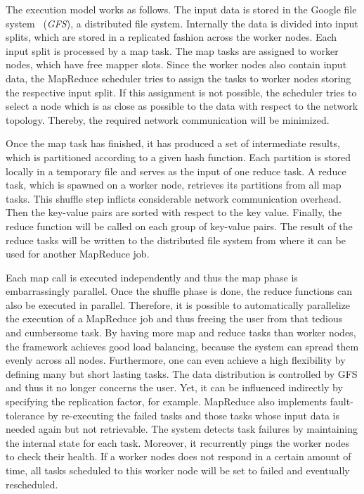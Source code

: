 The execution model works as follows.
The input data is stored in the Google file system~\cite{ghemawat:2003a} (\emph{GFS}), a distributed file system.
Internally the data is divided into input splits, which are stored in a replicated fashion across the worker nodes.
Each input split is processed by a map task.
The map tasks are assigned to worker nodes, which have free mapper slots.
Since the worker nodes also contain input data, the MapReduce scheduler tries to assign the tasks to worker nodes storing the respective input split.
If this assignment is not possible, the scheduler tries to select a node which is as close as possible to the data with respect to the network topology.
Thereby, the required network communication will be minimized.

Once the map task has finished, it has produced a set of intermediate results, which is partitioned according to a given hash function.
Each partition is stored locally in a temporary file and serves as the input of one reduce task.
A reduce task, which is spawned on a worker node, retrieves its partitions from all map tasks.
This shuffle step inflicts considerable network communication overhead.
Then the key-value pairs are sorted with respect to the key value.
Finally, the reduce function will be called on each group of key-value pairs.
The result of the reduce tasks will be written to the distributed file system from where it can be used for another MapReduce job.

Each map call is executed independently and thus the map phase is embarrassingly parallel.
Once the shuffle phase is done, the reduce functions can also be executed in parallel.
Therefore, it is possible to automatically parallelize the execution of a MapReduce job and thus freeing the user from that tedious and cumbersome task.
By having more map and reduce tasks than worker nodes, the framework achieves good load balancing, because the system can spread them evenly across all nodes.
Furthermore, one can even achieve a high flexibility by defining many but short lasting tasks.
The data distribution is controlled by GFS and thus it no longer concerns the user.
Yet, it can be influenced indirectly by specifying the replication factor, for example.
MapReduce also implements fault-tolerance by re-executing the failed tasks and those tasks whose input data is needed again but not retrievable.
The system detects task failures by maintaining the internal state for each task.
Moreover, it recurrently pings the worker nodes to check their health.
If a worker nodes does not respond in a certain amount of time, all tasks scheduled to this worker node will be set to failed and eventually rescheduled.

